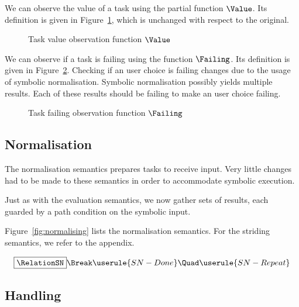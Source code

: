 We can observe the value of a task using the partial function $\Value$.
Its definition is given in Figure~\ref{fig:value}, which is unchanged with respect to the original.

\begin{figure}[h]
  \small
  \begin{center}
  \end{center}
  \caption{Task value observation function $\Value$}
  \label{fig:value}
\end{figure}

We can observe if a task is failing using the function $\Failing$.
Its definition is given in Figure~\ref{fig:failing}.
Checking if an user choice is failing changes due to the usage of symbolic normalisation.
Symbolic normalisation possibly yields multiple results.
Each of these results should be failing to make an user choice failing.

\begin{figure}[h]
  \small
  \begin{center}
  \end{center}
  \caption{Task failing observation function $\Failing$}
  \label{fig:failing}
\end{figure}

\subsection{Normalisation}

The normalisation semantics prepares tasks to receive input.
Very little changes had to be made to these semantics in order to accommodate symbolic execution.

Just as with the evaluation semantics, we now gather sets of results, each guarded by a path condition on the symbolic input.

Figure~\ref{fig:normalising} lists the normalisation semantics.
For the striding semantics, we refer to the appendix.



\begin{figure*}
  \small
  \begin{gather*}
    \boxed{\RelationSN} \Break
    \userule{SN-Done} \Quad
    \userule{SN-Repeat}
  \end{gather*}
  \caption{Symbolic normalisation semantics}
  \label{fig:normalising}
\end{figure*}


\subsection{Handling}

